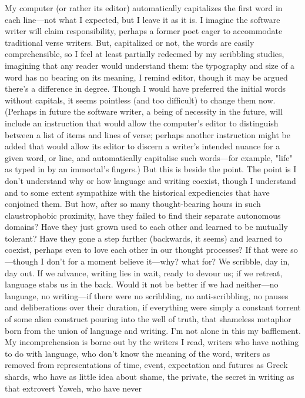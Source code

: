 \documentclass[
]{memoir}
\begin{document}
My computer (or rather its editor) automatically capitalizes the first
word in each line---not what I expected, but I leave it as it is. I
imagine the software writer will claim responsibility, perhaps a former
poet eager to accommodate traditional verse writers. But, capitalized or
not, the words are easily comprehensible, so I feel at least partially
redeemed by my scribbling studies, imagining that any reader would
understand them: the typography and size of a word has no bearing on its
meaning, I remind editor, though it may be argued there's a difference
in degree. Though I would have preferred the initial words without
capitals, it seems pointless (and too difficult) to change them now.
(Perhaps in future the software writer, a being of necessity in the
future, will include an instruction that would allow the computer's
editor to distinguish between a list of items and lines of verse;
perhaps another instruction might be added that would allow its editor
to discern a writer's intended nuance for a given word, or line, and
automatically capitalise such words---for example, "life" as typed in by
an immortal's fingers.) But this is beside the point. The point is I
don't understand why or how language and writing coexist, though I
understand and to some extent sympathize with the historical
expediencies that have conjoined them. But how, after so many
thought-bearing hours in such claustrophobic proximity, have they failed
to find their separate autonomous domains? Have they just grown used to
each other and learned to be mutually tolerant? Have they gone a step
further (backwards, it seems) and learned to coexist, perhaps even to
love each other in our thought processes? If that were so---though I
don't for a moment believe it---why? what for? We scribble, day in, day
out. If we advance, writing lies in wait, ready to devour us; if we
retreat, language stabs us in the back. Would it not be better if we had
neither---no language, no writing---if there were no scribbling, no
anti-scribbling, no pauses and deliberations over their duration, if
everything were simply a constant torrent of some alien construct
pouring into the well of truth, that shameless metaphor born from the
union of language and writing. I'm not alone in this my bafflement. My
incomprehension is borne out by the writers I read, writers who have
nothing to do with language, who don't know the meaning of the word,
writers as removed from representations of time, event, expectation and
futures as Greek shards, who have as little idea about shame, the
private, the secret in writing as that extrovert Yaweh, who have never
\end{document}
